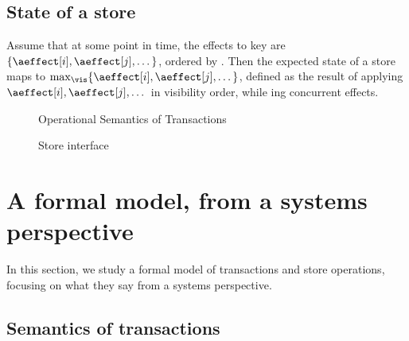 \subsection{State of a store}
\label{sec:compose-effects}

Assume that at some point in time, the effects to key \akey{} are $ \{
\aeffect[i], \aeffect[j], \ldots{} \}$, ordered by \vis{}.
Then the expected state of a store maps \akey{} to $\max_{\vis}\{
\aeffect[i], \aeffect[j], \ldots{} \}$, defined as the result of
applying $\aeffect[i], \aeffect[j], \ldots{}$ in visibility order,
while \merge{}ing concurrent effects.


%     

\begin{figure}[tp]
  \begin{minipage}{1.0\textwidth}
    \centering \small
    
  \end{minipage}
\caption{Operational Semantics of Transactions}
  \label{fig:transaction-semantics}
\end{figure}
\begin{figure}[tp]
  \centering \small
  
  \caption{Store interface}
  \label{fig:store-interface}
\end{figure}

\section{A formal model, from a systems perspective}
\label{sec:transaction-framework}

In this section, we study a formal model of transactions and store
operations, focusing on what they say from a systems perspective.

\subsection{Semantics of transactions}
\label{sec:formal-semantics}

